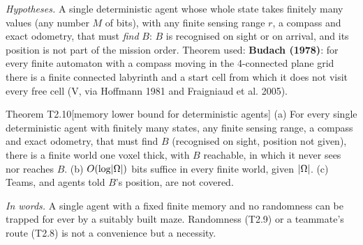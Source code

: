 \documentclass[11pt,a4paper]{article}
\DeclarePairedDelimiter\abs{\lvert}{\rvert}
\begin{document}
\noindent\emph{Hypotheses.} A single deterministic agent whose whole state takes finitely many values (any number $M$ of bits),
with any finite sensing range $r$, a compass and exact odometry, that must \emph{find} $B$: $B$ is recognised on sight or on
arrival, and its position is not part of the mission order. Theorem used: \textbf{Budach (1978)}: for every finite automaton
with a compass moving in the 4-connected plane grid there is a finite connected labyrinth and a start cell from which
it does not visit every free cell (V, via Hoffmann 1981 and Fraigniaud et al. 2005).

\begin{result}{Theorem T2.10}[memory lower bound for deterministic agents]
(a) For every single deterministic agent with finitely many states, any finite sensing range, a compass and exact
odometry, that must find $B$ (recognised on sight, position not given), there is a finite world one voxel thick, with
$B$ reachable, in which it never sees nor reaches $B$. (b) $O(\log\abs\Omega)$ bits suffice in every finite world, given
$\abs\Omega$. (c) Teams, and agents told $B$'s position, are not covered.
\end{result}
\noindent\emph{In words.} A single agent with a fixed finite memory and no randomness can be trapped for ever by a suitably built maze. Randomness (T2.9) or a teammate's route (T2.8) is not a convenience but a necessity.
\end{document}
